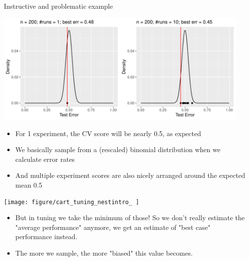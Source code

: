 \documentclass[11pt,compress,t,notes=noshow, xcolor=table]{beamer}
\newenvironment{knitrout}{}{} %
\begin{document}
\begin{vbframe}{Instructive and problematic example}
\begin{knitrout}\scriptsize
{}\color{fgcolor}

{\centering \includegraphics[width=0.95\textwidth]{figure/cart_tuning_nestintro_2}

}


\end{knitrout}

\begin{itemize}
\item For 1 experiment, the CV score will be nearly 0.5, as expected
\item We basically sample from a (rescaled) binomial distribution when we calculate error rates
\item And multiple experiment scores are also nicely arranged around the expected mean 0.5
\end{itemize}

\framebreak

\begin{knitrout}\scriptsize
{}\color{fgcolor}

{\centering \texttt{[image: figure/cart\_tuning\_nestintro\_
]}


\end{knitrout}

\begin{itemize}
\item But in tuning we take the minimum of those! So we don't really estimate the "average performance" anymore, we get an estimate of "best case" performance instead.
\item The more we sample, the more "biased" this value becomes.
\end{itemize}
\end{vbframe}
\end{document}
